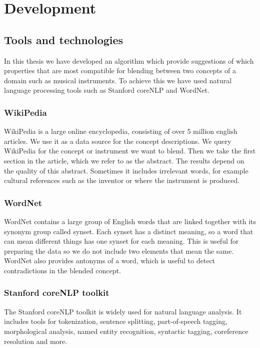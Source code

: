 
\chapter{Development} %

\label{Chapter4} %


\section{Tools and technologies}
In this thesis we have developed an algorithm which provide suggestions of which properties that are most compatible for blending between two concepts of a domain such as musical instruments. To achieve this we have used natural language processing tools such as Stanford coreNLP and WordNet.

\subsection{WikiPedia}
WikiPedia is a large online encyclopedia, consisting of over 5 million english articles. We use it as a data source for the concept descriptions. We query WikiPedia for the concept or instrument we want to blend. Then we take the first section in the article, which we refer to as the abstract. The results depend on the quality of this abstract. Sometimes it includes irrelevant words, for example cultural references such as the inventor or where the instrument is produced.

\subsection{WordNet}
WordNet contains a large group of English words that are linked together with its synonym group called synset. Each synset has a distinct meaning, so a word that can mean different things has one synset for each meaning. This is useful for preparing the data so we do not include two elements that mean the same. WordNet also provides antonyms of a word, which is useful to detect contradictions in the blended concept.

\subsection{Stanford coreNLP toolkit}
The Stanford coreNLP toolkit is widely used for natural language analysis. It includes tools for tokenization, sentence splitting, part-of-speech tagging, morphological analysis, named entity recognition, syntactic tagging, coreference resolution and more. \parencite{manning-EtAl:2014:P14-5}

